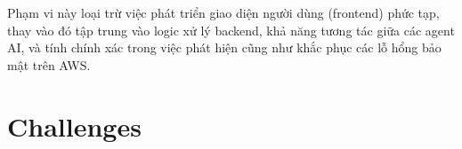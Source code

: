 Phạm vi này loại trừ việc phát triển giao diện người dùng (frontend) phức tạp, thay vào đó tập trung vào logic xử lý backend, khả năng tương tác giữa các agent AI, và tính chính xác trong việc phát hiện cũng như khắc phục các lỗ hổng bảo mật trên AWS.







\section{Challenges}

